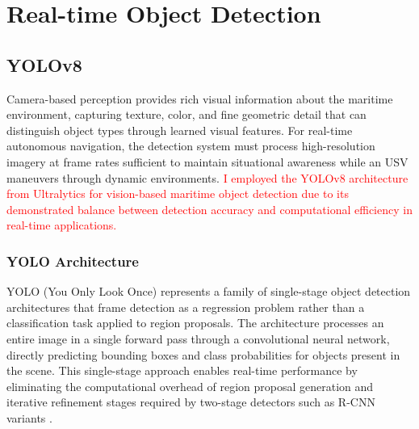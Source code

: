 \documentclass{erauthesis}
\begin{document}
\chapter{Real-time Object Detection} \label{realtime_object_detection}


\section{YOLOv8} \label{yolo}

Camera-based perception provides rich visual information about the maritime environment, capturing texture, color, and fine geometric detail that can distinguish object types through learned visual features.
For real-time autonomous navigation, the detection system must process high-resolution imagery at frame rates sufficient to maintain situational awareness while an \ac{USV} maneuvers through dynamic environments.
\textcolor{red}{I employed the YOLOv8 architecture from Ultralytics for vision-based maritime object detection due to its demonstrated balance between detection accuracy and computational efficiency in real-time applications.}

\subsection{YOLO Architecture } \label{sec:yolo_architecture}

YOLO (You Only Look Once) represents a family of single-stage object detection architectures that frame detection as a regression problem rather than a classification task applied to region proposals.
The architecture processes an entire image in a single forward pass through a convolutional neural network, directly predicting bounding boxes and class probabilities for objects present in the scene.
This single-stage approach enables real-time performance by eliminating the computational overhead of region proposal generation and iterative refinement stages required by two-stage detectors such as R-CNN variants \cite{ultralytics}.
\end{document}
